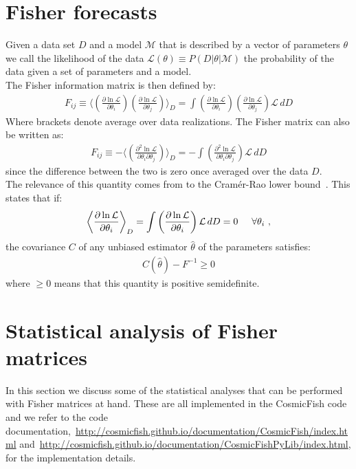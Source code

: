 \documentclass[prd,nofootinbib,showpacs]{revtex4}
\begin{document}
%
\section{Fisher forecasts}
%
Given a data set $D$ and a model $\mathcal{M}$ that is described by a vector of parameters $\theta$  we call the likelihood of the data $\mathcal{L}(\theta) \equiv P(D|\theta|\mathcal{M})$ the probability of the data given a set of parameters and a model. \\
%
The Fisher information matrix is then defined by:
%
\begin{align} \label{Eq:FisherMatrixDefinition}
F_{ij} \equiv \bigg\langle \left( \frac{\partial \ln \mathcal{L} }{\partial \theta_i}\right) \left( \frac{\partial \ln \mathcal{L} }{\partial \theta_j}\right) \bigg\rangle_{D} = \int \left( \frac{\partial \ln \mathcal{L} }{\partial \theta_i}\right) \left( \frac{\partial \ln \mathcal{L} }{\partial \theta_j}\right) \mathcal{L}\, dD
\end{align}
%
Where brackets denote average over data realizations.
%
The Fisher matrix can also be written as:
%
\begin{align} \label{Eq:FisherMatrixSecondDefinition}
F_{ij} \equiv -\bigg\langle \left( \frac{\partial^2 \ln \mathcal{L} }{\partial \theta_i \partial \theta_j}\right) \bigg\rangle_{D} = - \int \left( \frac{\partial^2 \ln \mathcal{L} }{\partial \theta_i \partial \theta_j}\right) \mathcal{L}\, dD
\end{align}
%
since the difference between the two is zero once averaged over the data $D$. \\
%
The relevance of this quantity comes from to the Cram\'er-Rao lower bound~\cite{KayStat}. This states that if:
%
\begin{align}
\bigg\langle \frac{\partial \ln  \mathcal{L} }{\partial \theta_i}\bigg\rangle_{D} = \int \left( \frac{\partial \ln  \mathcal{L} }{\partial \theta_i} \right) \mathcal{L}\, dD = 0 \hspace{0.5cm} \forall \theta_i \,\,,
\end{align}
%
the covariance $C$ of any unbiased estimator $\hat{\theta}$ of the parameters satisfies:
%
\begin{align} \label{Eq:CramerRao}
C(\hat{\theta}) - F^{-1} \geq 0
\end{align}
%
where $\geq 0$ means that this quantity is positive semidefinite. \\

%
\section{Statistical analysis of Fisher matrices}
%
In this section we discuss some of the statistical analyses that can be performed with Fisher matrices at hand. These are all implemented in the CosmicFish code and we refer to the code documentation,~\url{http://cosmicfish.github.io/documentation/CosmicFish/index.html} and~\url{http://cosmicfish.github.io/documentation/CosmicFishPyLib/index.html}, for the implementation details.
%
\end{document}
